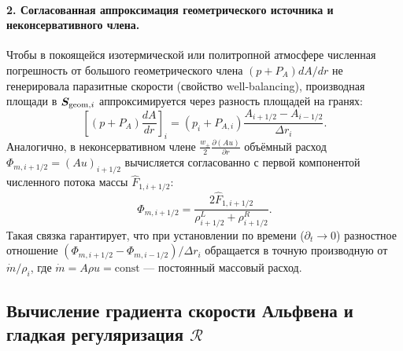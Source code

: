 \documentclass[11pt,a4paper]{article}
\begin{document}
\paragraph{2. Согласованная аппроксимация геометрического источника и неконсервативного члена.}
Чтобы в покоящейся изотермической или политропной атмосфере численная погрешность от большого геометрического члена $(p + P_A)dA/dr$ не генерировала паразитные скорости (свойство well-balancing), производная площади в $\bm{S}_{{\rm geom},i}$ аппроксимируется через разность площадей на гранях:
\begin{equation}
\left[(p + P_A)\frac{dA}{dr}\right]_i = (p_i + P_{A,i})\frac{A_{i+1/2} - A_{i-1/2}}{\Delta r_i}.
\label{eq:wb_geom}
\end{equation}
Аналогично, в неконсервативном члене $\frac{w_\pm}{2}\frac{\partial(Au)}{\partial r}$ объёмный расход $\Phi_{m,i+1/2} = (Au)_{i+1/2}$ вычисляется согласованно с первой компонентой численного потока массы $\hat{F}_{1,i+1/2}$:
\begin{equation}
\Phi_{m,i+1/2} = \frac{2\hat{F}_{1,i+1/2}}{\rho_{i+1/2}^L + \rho_{i+1/2}^R}.
\label{eq:noncons_au}
\end{equation}
Такая связка гарантирует, что при установлении по времени ($\partial_t \to 0$) разностное отношение $(\Phi_{m,i+1/2} - \Phi_{m,i-1/2})/\Delta r_i$ обращается в точную производную от $\dot{m}/\rho_i$, где $\dot{m} = A\rho u = \mathrm{const}$ --- постоянный массовый расход.

\subsection{Вычисление градиента скорости Альфвена и гладкая регуляризация \texorpdfstring{$\mathcal{R}$}{R}}
\end{document}
